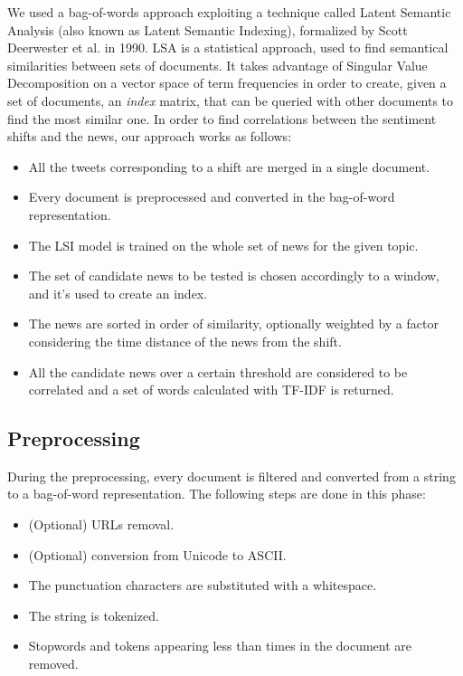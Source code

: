 We used a bag-of-words approach exploiting a technique called Latent Semantic Analysis (also known as Latent Semantic Indexing), formalized by Scott Deerwester et al. in 1990\cite{Deerwester}. LSA is a statistical approach, used to find semantical similarities between sets of documents. It takes advantage of Singular Value Decomposition on a vector space of term frequencies in order to create, given a set of documents, an \emph{index} matrix, that can be queried with other documents to find the most similar one. In order to find correlations between the sentiment shifts and the news, our approach works as follows:
\begin{itemize}
\item All the tweets corresponding to a shift are merged in a single document.
\item Every document is preprocessed and converted in the bag-of-word representation.
\item The LSI model is trained on the whole set of news for the given topic.
\item The set of candidate news to be tested is chosen accordingly to a window, and it's used to create an index.
\item The news are sorted in order of similarity, optionally weighted by a factor considering the time distance of the news from the shift.
\item All the candidate news over a certain threshold are considered to be correlated and a set of words calculated with TF-IDF is returned.
\end{itemize}

\subsection{Preprocessing}
During the preprocessing, every document is filtered and converted from a string to a bag-of-word representation. The following steps are done in this phase:
\begin{itemize}
\item (Optional) URLs removal.
\item (Optional) conversion from Unicode to ASCII.
\item The punctuation characters are substituted with a whitespace.
\item The string is tokenized.
\item Stopwords and tokens appearing less than  times in the document are removed.
\end{itemize}

